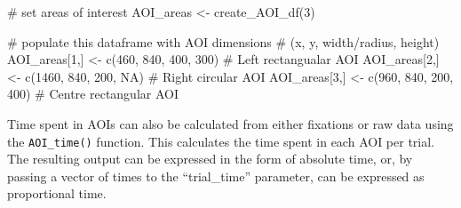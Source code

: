 \documentclass[
  man,
  floatsintext,
  longtable,
  nolmodern,
  notxfonts,
  notimes,
  colorlinks=true,linkcolor=blue,citecolor=blue,urlcolor=blue]{apa7}
\newenvironment{Shaded}{\begin{snugshade}}{\end{snugshade}}
\newcommand{\AttributeTok}[1]{\textcolor[rgb]{0.40,0.45,0.13}{#1}}
\newcommand{\CommentTok}[1]{\textcolor[rgb]{0.37,0.37,0.37}{#1}}
\newcommand{\ConstantTok}[1]{\textcolor[rgb]{0.56,0.35,0.01}{#1}}
\newcommand{\DecValTok}[1]{\textcolor[rgb]{0.68,0.00,0.00}{#1}}
\newcommand{\FunctionTok}[1]{\textcolor[rgb]{0.28,0.35,0.67}{#1}}
\newcommand{\NormalTok}[1]{\textcolor[rgb]{0.00,0.23,0.31}{#1}}
\newcommand{\OtherTok}[1]{\textcolor[rgb]{0.00,0.23,0.31}{#1}}
\newcommand{\SpecialCharTok}[1]{\textcolor[rgb]{0.37,0.37,0.37}{#1}}
\newcommand{\StringTok}[1]{\textcolor[rgb]{0.13,0.47,0.30}{#1}}
\begin{document}
\begin{Shaded}
\begin{Highlighting}[]
\CommentTok{\# set areas of interest}
\NormalTok{AOI\_areas }\OtherTok{\textless{}{-}} \FunctionTok{create\_AOI\_df}\NormalTok{(}\DecValTok{3}\NormalTok{)}

\CommentTok{\# populate this dataframe with AOI dimensions }
\CommentTok{\# (x, y, width/radius, height)}
\NormalTok{AOI\_areas[}\DecValTok{1}\NormalTok{,] }\OtherTok{\textless{}{-}} \FunctionTok{c}\NormalTok{(}\DecValTok{460}\NormalTok{, }\DecValTok{840}\NormalTok{, }\DecValTok{400}\NormalTok{, }\DecValTok{300}\NormalTok{) }\CommentTok{\# Left rectangualar AOI}
\NormalTok{AOI\_areas[}\DecValTok{2}\NormalTok{,] }\OtherTok{\textless{}{-}} \FunctionTok{c}\NormalTok{(}\DecValTok{1460}\NormalTok{, }\DecValTok{840}\NormalTok{, }\DecValTok{200}\NormalTok{, }\ConstantTok{NA}\NormalTok{) }\CommentTok{\# Right circular AOI}
\NormalTok{AOI\_areas[}\DecValTok{3}\NormalTok{,] }\OtherTok{\textless{}{-}} \FunctionTok{c}\NormalTok{(}\DecValTok{960}\NormalTok{, }\DecValTok{840}\NormalTok{, }\DecValTok{200}\NormalTok{, }\DecValTok{400}\NormalTok{) }\CommentTok{\# Centre rectangular AOI}
\end{Highlighting}
\end{Shaded}

Time spent in AOIs can also be calculated from either fixations or raw
data using the \texttt{AOI\_time()} function. This calculates the time
spent in each AOI per trial. The resulting output can be expressed in
the form of absolute time, or, by passing a vector of times to the
``trial\_time'' parameter, can be expressed as proportional time.

\begin{Shaded}
\end{Shaded}
\end{document}
